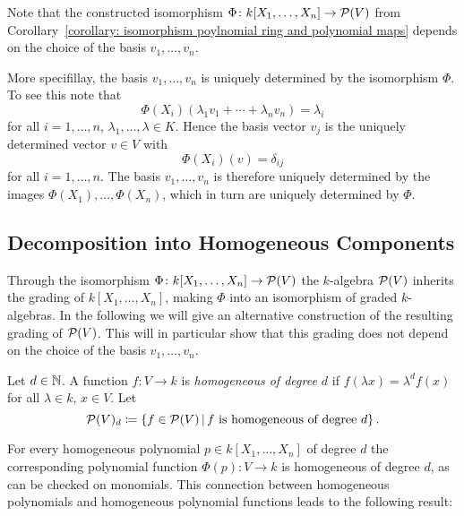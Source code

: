 \begin{remark}
  Note that the constructed isomorphism $\Phi \colon k[X_1, \dotsc, X_n] \to \mathcal{P}(V)$ from Corollary~\ref{corollary: isomorphism poylnomial ring and polynomial maps} depends on the choice of the basis $v_1, \dotsc, v_n$.
  
  More specifillay, the basis $v_1, \dotsc, v_n$ is uniquely determined by the isomorphism $\Phi$.
  To see this note that
  \[
      \Phi(X_i)(\lambda_1 v_1 + \dotsb + \lambda_n v_n)
    = \lambda_i
  \]
  for all $i = 1, \dotsc, n$, $\lambda_1, \dotsc, \lambda \in K$.
  Hence the basis vector $v_j$ is the uniquely determined vector $v \in V$ with
  \[
      \Phi(X_i)(v)
    = \delta_{ij}
  \]
  for all $i = 1, \dotsc, n$.
  The basis $v_1, \dotsc, v_n$ is therefore uniquely determined by the images $\Phi(X_1), \dotsc, \Phi(X_n)$, which in turn are uniquely determined by $\Phi$.
\end{remark}





\subsection{Decomposition into Homogeneous Components}


\begin{fluff}
  \label{fluff: motivation for homogeneous functions}
  Through the isomorphism $\Phi \colon k[X_1, \dotsc, X_n] \to \mathcal{P}(V)$ the $k$-algebra $\mathcal{P}(V)$ inherits the grading of $k[X_1, \dotsc, X_n]$, making $\Phi$ into an isomorphism of graded $k$-algebras.
  In the following we will give an alternative construction of the resulting grading of $\mathcal{P}(V)$.
  This will in particular show that this grading does not depend on the choice of the basis $v_1, \dotsc, v_n$.
\end{fluff}


\begin{definition}
  Let $d \in \mathbb{N}$.
  A function $f \colon V \to k$ is \emph{homogeneous of degree $d$} if $f(\lambda x) = \lambda^d f(x)$ for all $\lambda \in k$, $x \in V$.
  Let
  \[
              \mc{P}(V)_d
    \defined  \{
                f \in \mc{P}(V)
              \suchthat
                \text{$f$ is homogeneous of degree $d$}
              \} \,.
  \]
\end{definition}


\begin{fluff}
  \label{fluff: homogeneous polynomial to polynomial function}
  For every homogeneous polynomial $p \in k[X_1, \dotsc, X_n]$ of degree $d$ the corresponding polynomial function $\Phi(p) \colon V \to k$ is homogeneous of degree $d$, as can be checked on monomials.
  This connection between homogeneous polynomials and homogeneous polynomial functions leads to the following result:
\end{fluff}


